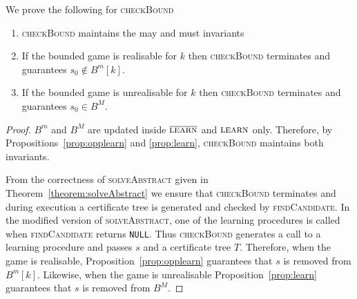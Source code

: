 \begin{proposition}\label{prop:checkBound}
    We prove the following for \textsc{checkBound}
    \begin{enumerate}
        \item \textsc{checkBound} maintains the may and must invariants
        \item If the bounded game is realisable for $k$ then \textsc{checkBound} terminates and guarantees $s_0 \not\in B^m[k]$.
        \item If the bounded game is unrealisable for $k$ then \textsc{checkBound} terminates and guarantees $s_0 \in B^M$.
    \end{enumerate}
\end{proposition}
\begin{proof}
    $B^m$ and $B^M$ are updated inside $\textsc{$\overline{\mbox{learn}}$}$ and $\textsc{learn}$ only. Therefore, by Propositions~\ref{prop:opplearn} and \ref{prop:learn}, \textsc{checkBound} maintains both invariants.

    From the correctness of \textsc{solveAbstract} given in Theorem~\ref{theorem:solveAbstract} we ensure that \textsc{checkBound} terminates and during execution a certificate tree is generated and checked by \textsc{findCandidate}. In the modified version of \textsc{solveAbstract}, one of the learning procedures is called when \textsc{findCandidate} returns \texttt{NULL}. Thus \textsc{checkBound} generates a call to a learning procedure and passes $s$ and a certificate tree $T$.  Therefore, when the game is realisable, Proposition~\ref{prop:opplearn} guarantees that $s$ is removed from $B^m[k]$. Likewise, when the game is unrealisable Proposition~\ref{prop:learn} guarantees that $s$ is removed from $B^M$.

\end{proof}


